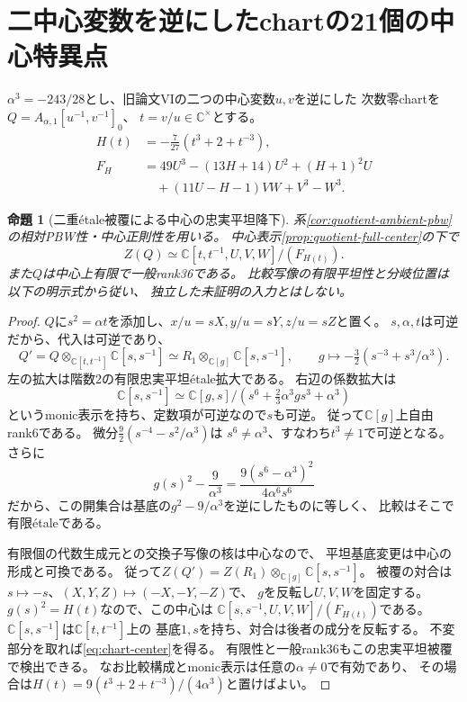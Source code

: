 \documentclass[11pt,a4paper]{ltjsarticle}
\newtheorem{proposition}[theorem]{命題}
\newcommand{\CC}{\mathbb C}
\begin{document}


\section{二中心変数を逆にしたchartの21個の中心特異点}
\label{sec:quantum-boundary-center}
$\alpha^3=-243/28$とし、旧論文VIの二つの中心変数$u,v$を逆にした
次数零chartを$Q=A_{\alpha,1}[u^{-1},v^{-1}]_0$、
$t=v/u\in\CC^\times$とする。
\begin{equation}\label{eq:Ht}
 \begin{aligned}
 H(t)&=-\frac7{27}(t^3+2+t^{-3}),\\
 F_H&=49U^3-(13H+14)U^2+(H+1)^2U\\
 &\quad +(11U-H-1)VW+V^3-W^3 .
 \end{aligned}
\end{equation}
\begin{proposition}[二重\'etale被覆による中心の忠実平坦降下]
\label{prop:chart-descent}
系\ref{cor:quotient-ambient-pbw}の相対PBW性・中心正則性を用いる。
中心表示\ref{prop:quotient-full-center}の下で
\begin{equation}\label{eq:chart-center}
 Z(Q)\simeq
 \CC[t,t^{-1},U,V,W]/(F_{H(t)}).
\end{equation}
また$Q$は中心上有限で一般rank36である。
比較写像の有限平坦性と分岐位置は以下の明示式から従い、
独立した未証明の入力とはしない。
\end{proposition}
\begin{proof}
$Q$に$s^2=\alpha t$を添加し、$x/u=sX,y/u=sY,z/u=sZ$と置く。
$s,\alpha,t$は可逆だから、代入は可逆であり、
\[
 Q'=Q\otimes_{\CC[t,t^{-1}]}\CC[s,s^{-1}]
 \simeq R_1\otimes_{\CC[g]}\CC[s,s^{-1}],\qquad
 g\longmapsto-\tfrac32\left(s^{-3}+s^3/\alpha^3\right).
\]
左の拡大は階数2の有限忠実平坦\'etale拡大である。
右辺の係数拡大は
\[
 \CC[s,s^{-1}]
 \simeq\CC[g,s]/\left(s^6+\tfrac23\alpha^3gs^3+\alpha^3\right)
\]
というmonic表示を持ち、定数項が可逆なので$s$も可逆。
従って$\CC[g]$上自由rank6である。
微分$\frac92(s^{-4}-s^2/\alpha^3)$は
$s^6\ne\alpha^3$、すなわち$t^3\ne1$で可逆となる。
さらに
\[
 g(s)^2-\frac9{\alpha^3}
 =\frac{9(s^6-\alpha^3)^2}{4\alpha^6s^6}
\]
だから、この開集合は基底の$g^2-9/\alpha^3$を逆にしたものに等しく、
比較はそこで有限\'etaleである。

有限個の代数生成元との交換子写像の核は中心なので、
平坦基底変更は中心の形成と可換である。
従って$Z(Q')=Z(R_1)\otimes_{\CC[g]}\CC[s,s^{-1}]$。
被覆の対合は$s\mapsto-s$、$(X,Y,Z)\mapsto(-X,-Y,-Z)$で、
$g$を反転し$U,V,W$を固定する。
$g(s)^2=H(t)$なので、この中心は
$\CC[s,s^{-1},U,V,W]/(F_{H(t)})$である。
$\CC[s,s^{-1}]$は$\CC[t,t^{-1}]$上の
基底$1,s$を持ち、対合は後者の成分を反転する。
不変部分を取れば\eqref{eq:chart-center}を得る。
有限性と一般rank36もこの忠実平坦被覆で検出できる。
なお比較構成とmonic表示は任意の$\alpha\ne0$で有効であり、
その場合は$H(t)=9(t^3+2+t^{-3})/(4\alpha^3)$と置けばよい。
\end{proof}
\end{document}
